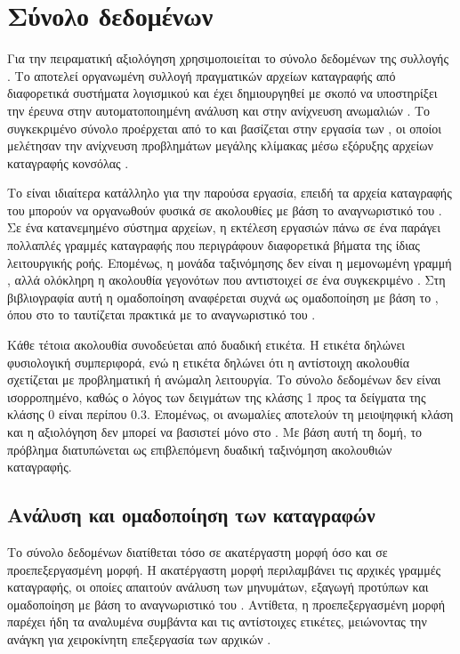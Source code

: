 \section{Σύνολο δεδομένων }

Για την πειραματική αξιολόγηση χρησιμοποιείται το σύνολο δεδομένων  της συλλογής . Το  αποτελεί οργανωμένη συλλογή πραγματικών αρχείων καταγραφής από διαφορετικά συστήματα λογισμικού και έχει δημιουργηθεί με σκοπό να υποστηρίξει την έρευνα στην αυτοματοποιημένη ανάλυση  και στην ανίχνευση ανωμαλιών \cite{zhu2023loghub}. Το συγκεκριμένο σύνολο  προέρχεται από το  και βασίζεται στην εργασία των , οι οποίοι μελέτησαν την ανίχνευση προβλημάτων μεγάλης κλίμακας μέσω εξόρυξης αρχείων καταγραφής κονσόλας \cite{xu2009detecting}.

Το  είναι ιδιαίτερα κατάλληλο για την παρούσα εργασία, επειδή τα αρχεία καταγραφής του μπορούν να οργανωθούν φυσικά σε ακολουθίες με βάση το αναγνωριστικό του . Σε ένα κατανεμημένο σύστημα αρχείων, η εκτέλεση εργασιών πάνω σε ένα  παράγει πολλαπλές γραμμές καταγραφής που περιγράφουν διαφορετικά βήματα της ίδιας λειτουργικής ροής. Επομένως, η μονάδα ταξινόμησης δεν είναι η μεμονωμένη γραμμή , αλλά ολόκληρη η ακολουθία γεγονότων που αντιστοιχεί σε ένα συγκεκριμένο . Στη βιβλιογραφία αυτή η ομαδοποίηση αναφέρεται συχνά ως ομαδοποίηση με βάση το , όπου στο  το  ταυτίζεται πρακτικά με το αναγνωριστικό  του .

Κάθε τέτοια ακολουθία συνοδεύεται από δυαδική ετικέτα. Η ετικέτα  δηλώνει φυσιολογική συμπεριφορά, ενώ η ετικέτα  δηλώνει ότι η αντίστοιχη ακολουθία σχετίζεται με προβληματική ή ανώμαλη λειτουργία. Το σύνολο δεδομένων δεν είναι ισορροπημένο, καθώς ο λόγος των δειγμάτων της κλάσης 1 προς τα δείγματα της κλάσης 0 είναι περίπου \(0.3\). Επομένως, οι ανωμαλίες αποτελούν τη μειοψηφική κλάση και η αξιολόγηση δεν μπορεί να βασιστεί μόνο στο . Με βάση αυτή τη δομή, το πρόβλημα διατυπώνεται ως επιβλεπόμενη δυαδική ταξινόμηση ακολουθιών καταγραφής.

\subsection{Ανάλυση και ομαδοποίηση των καταγραφών}

Το σύνολο δεδομένων  διατίθεται τόσο σε ακατέργαστη μορφή όσο και σε προεπεξεργασμένη μορφή. Η ακατέργαστη μορφή περιλαμβάνει τις αρχικές γραμμές καταγραφής, οι οποίες απαιτούν ανάλυση των μηνυμάτων, εξαγωγή προτύπων και ομαδοποίηση με βάση το αναγνωριστικό του . Αντίθετα, η προεπεξεργασμένη μορφή παρέχει ήδη τα αναλυμένα συμβάντα και τις αντίστοιχες ετικέτες, μειώνοντας την ανάγκη για χειροκίνητη επεξεργασία των αρχικών .

